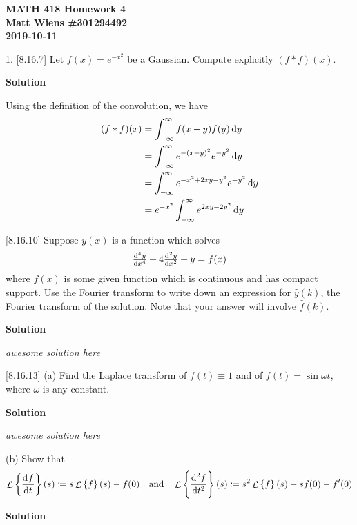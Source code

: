 \documentclass{article}
\DeclareMathOperator{\Lagr}{\mathcal{L}}
\begin{document}
\textbf{MATH 418 Homework 4} \\
\textbf{Matt Wiens \#301294492} \\
\textbf{2019-10-11}

1. [8.16.7] Let $f(x) = e^{-x^2}$ be a Gaussian. Compute explicitly $(f * f)(x)$.

\textbf{Solution}

Using the definition of the convolution, we have
%
\begin{align*}
    (f * f)(x)
        &= \int_{- \infty}^{\infty} f(x - y) f(y) \dif y \\
        &= \int_{- \infty}^{\infty} e^{-(x - y)^2} e^{-y^2} \dif y \\
        &= \int_{- \infty}^{\infty} e^{-x^2 + 2 x y - y^2} e^{-y^2} \dif y \\
        &= e^{-x^2} \int_{- \infty}^{\infty} e^{2 x y - 2 y^2} \dif y
\end{align*}

\vspace{5mm}

[8.16.10] Suppose $y(x)$ is a function which solves
%
\begin{equation*}
    \od[4]{y}{x} + 4 \od[2]{y}{x} + y = f(x)
\end{equation*}
%
where $f(x)$ is some given function which is continuous and has compact
support. Use the Fourier transform to write down an expression for
$\widehat{y}(k)$, the Fourier transform of the solution. Note that your
answer will involve $\widehat{f}(k)$.

\textbf{Solution}

\textit{awesome solution here}

\vspace{5mm}

[8.16.13] (a) Find the Laplace transform of $f(t) \equiv 1$ and of
$f(t) = \sin \omega t$, where $\omega$ is any constant.

\textbf{Solution}

\textit{awesome solution here}

\vspace{5mm}

(b) Show that
%
\begin{equation*}
    \Lagr \cbr{\dod{f}{t}}(s) \coloneqq s \Lagr \cbr{f}(s) - f(0)
    \quad \text{and} \quad
    \Lagr \cbr{\dod[2]{f}{t}}(s) \coloneqq s^2 \Lagr \cbr{f}(s) - s f(0) - f^\prime(0)
\end{equation*}

\textbf{Solution}
\end{document}
